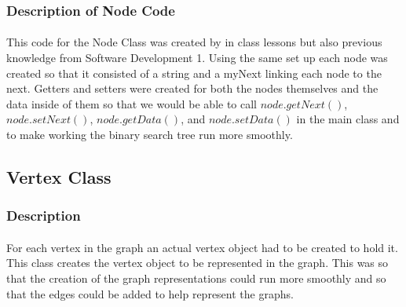 \documentclass[letterpaper, 10pt,DIV=13]{scrartcl}
\numberwithin{equation}{section} %
\numberwithin{figure}{section} %
\numberwithin{table}{section} %
\begin{document}
\subsubsection{Description of Node Code}
\paragraph{} This code for the Node Class was created by in class lessons but also previous knowledge from Software Development 1. Using the same set up each node was created so that it consisted of a string and a myNext linking each node to the next. Getters and setters were created for both the nodes themselves and the data inside of them so that we would be able to call $node.getNext()$, $node.setNext()$, $node.getData()$, and $node.setData()$ in the main class and to make working the binary search tree run more smoothly.

\subsection{Vertex Class}

\subsubsection{Description}
\paragraph{} For each vertex in the graph an actual vertex object had to be created to hold it. This class creates the vertex object to be represented in the graph. This was so that the creation of the graph representations could run more smoothly and so that the edges could be added to help represent the graphs. 
\end{document}
